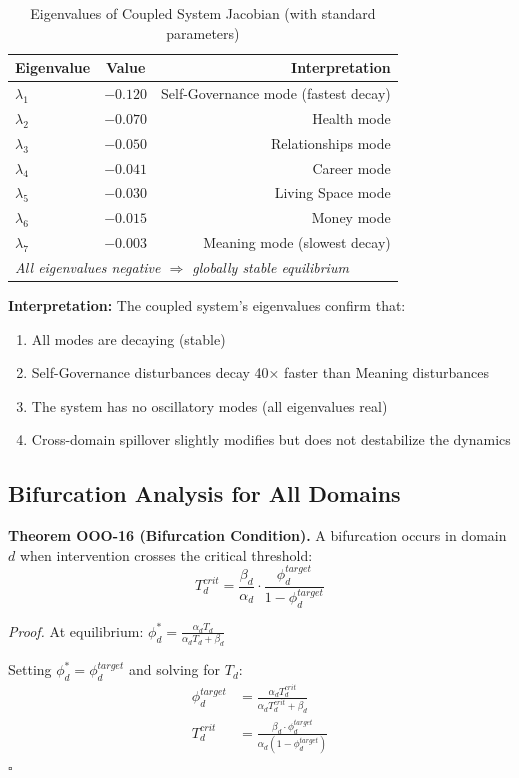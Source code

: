 \begin{table}[htbp]
\centering
\caption{Eigenvalues of Coupled System Jacobian (with standard parameters)}
\label{tab:ooo-eigenvalues}
\renewcommand{\arraystretch}{1.2}
\small
\begin{tabular}{@{}lcr@{}}
\toprule
\textbf{Eigenvalue} & \textbf{Value} & \textbf{Interpretation} \\
\midrule
$\lambda_1$ & $-0.120$ & Self-Governance mode (fastest decay) \\
$\lambda_2$ & $-0.070$ & Health mode \\
$\lambda_3$ & $-0.050$ & Relationships mode \\
$\lambda_4$ & $-0.041$ & Career mode \\
$\lambda_5$ & $-0.030$ & Living Space mode \\
$\lambda_6$ & $-0.015$ & Money mode \\
$\lambda_7$ & $-0.003$ & Meaning mode (slowest decay) \\
\midrule
\multicolumn{3}{l}{\textit{All eigenvalues negative $\Rightarrow$ globally stable equilibrium}} \\
\bottomrule
\end{tabular}
\end{table}

\textbf{Interpretation:} The coupled system's eigenvalues confirm that:
\begin{enumerate}[nosep]
\item All modes are decaying (stable)
\item Self-Governance disturbances decay 40× faster than Meaning disturbances
\item The system has no oscillatory modes (all eigenvalues real)
\item Cross-domain spillover slightly modifies but does not destabilize the dynamics
\end{enumerate}

\subsection{Bifurcation Analysis for All Domains}

\begin{tcolorbox}[colback=yellow!5!white, colframe=yellow!75!black, title=Theorem OOO-16: Universal Bifurcation Condition]
\textbf{Theorem OOO-16 (Bifurcation Condition).}
A bifurcation occurs in domain $d$ when intervention crosses the critical threshold:
\begin{equation}
T_d^{crit} = \frac{\beta_d}{\alpha_d} \cdot \frac{\phi_d^{target}}{1 - \phi_d^{target}}
\end{equation}

\textit{Proof.}
At equilibrium: $\phi_d^* = \frac{\alpha_d T_d}{\alpha_d T_d + \beta_d}$

Setting $\phi_d^* = \phi_d^{target}$ and solving for $T_d$:
\begin{align}
\phi_d^{target} &= \frac{\alpha_d T_d^{crit}}{\alpha_d T_d^{crit} + \beta_d} \\
T_d^{crit} &= \frac{\beta_d \cdot \phi_d^{target}}{\alpha_d (1 - \phi_d^{target})}
\end{align}
\hfill $\square$
\end{tcolorbox}


